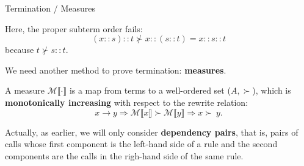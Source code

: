 \documentclass[compress,dvipdfmx]{beamer}
\newcommand\cons[2]{{#1}\!::\!{#2}}
\newcommand\measure[1]{\mathcal{M}\llbracket{#1}\rrbracket}
\begin{document}
%
\begin{frame}{Termination / Measures}

  Here, the proper subterm order fails:
  \begin{equation*}
    \cons{(\cons{x}{s})}{t} \nsucc
    \cons{x}{(\cons{s}{t})} = \cons{x}{\cons{s}{t}}
  \end{equation*}
  because \(t \nsucc \cons{s}{t}\).

  \bigskip

  We need another method to prove termination: \textbf{measures}.

  \bigskip

  A measure \(\measure{\cdot}\) is a map from terms to a
  well\hyp{}ordered set (\(A,\succ\)), which is \textbf{monotonically
    increasing} with respect to the rewrite relation:
  \begin{equation*}
    x \rightarrow y
    \Rightarrow
    \measure{x} \succ  \measure{y}  \Rightarrow x \succ\ y.
  \end{equation*}

  \medskip

  Actually, as earlier, we will only consider \textbf{dependency
    pairs}, that is, pairs of calls whose first component is the
  left\hyp{}hand side of a rule and the second components are the
  calls in the righ\hyp{}hand side of the same rule.

\end{frame}
\end{document}
